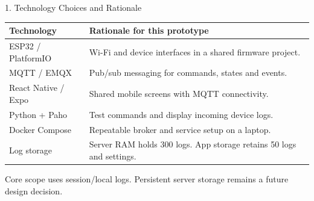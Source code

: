 \documentclass[aspectratio=169,11pt]{beamer}
\renewcommand{\arraystretch}{1.18}
\begin{document}
\begin{frame}{1. Technology Choices and Rationale}
  \small
  \begingroup
  \renewcommand{\arraystretch}{1.35}
  \begin{tabularx}{\textwidth}{@{}>{\raggedright\arraybackslash}p{3.4cm}>{\raggedright\arraybackslash}X@{}}
    \toprule
    \textbf{Technology} & \textbf{Rationale for this prototype} \\
    \midrule
    ESP32 / PlatformIO & Wi-Fi and device interfaces in a shared firmware project. \\
    MQTT / EMQX & Pub/sub messaging for commands, states and events. \\
    React Native / Expo & Shared mobile screens with MQTT connectivity. \\
    Python + Paho & Test commands and display incoming device logs. \\
    Docker Compose & Repeatable broker and service setup on a laptop. \\
    Log storage & Server RAM holds 300 logs. App storage retains 50 logs and settings. \\
    \bottomrule
  \end{tabularx}
  \endgroup
  \par\vspace{0.3cm}
  \begin{minipage}{\textwidth}
    \footnotesize\raggedright
    Core scope uses session/local logs. Persistent server storage remains a future design decision.
  \end{minipage}
\end{frame}
\end{document}
